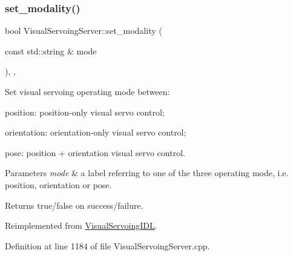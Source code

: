 \mbox{\label{classVisualServoingServer_a6d9ec4489caebf0a52b2e5ee149aeb6d}} 
\subsubsection{\texorpdfstring{set\+\_\+modality()}{set\_modality()}}
{\footnotesize\ttfamily bool Visual\+Servoing\+Server\+::set\+\_\+modality (\begin{DoxyParamCaption}\item[{const std\+::string \&}]{mode }\end{DoxyParamCaption})\hspace{0.3cm}{\ttfamily [override]}, {\ttfamily [protected]}, {\ttfamily [virtual]}}



Set visual servoing operating mode between\+: 


\begin{DoxyEnumerate}
\item \textquotesingle{}position\textquotesingle{}\+: position-\/only visual servo control;
\item \textquotesingle{}orientation\textquotesingle{}\+: orientation-\/only visual servo control;
\item \textquotesingle{}pose\textquotesingle{}\+: position + orientation visual servo control. 
\begin{DoxyParams}{Parameters}
{\em mode} & a label referring to one of the three operating mode, i.\+e. \textquotesingle{}position\textquotesingle{}, \textquotesingle{}orientation\textquotesingle{} or \textquotesingle{}pose\textquotesingle{}. \\
\hline
\end{DoxyParams}
\begin{DoxyReturn}{Returns}
true/false on success/failure. 
\end{DoxyReturn}

\end{DoxyEnumerate}

Reimplemented from \hyperlink{classVisualServoingIDL_acf88e08e442c512452efe69f103f8f12}{Visual\+Servoing\+I\+DL}.



Definition at line 1184 of file Visual\+Servoing\+Server.\+cpp.

